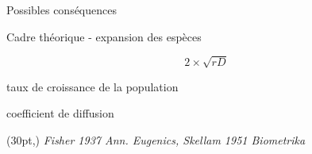 \documentclass[11pt, compress, aspectratio=1610]{beamer}
\newcommand\smallcitation[1]{%
\begin{textblock*}{\textwidth}(30pt,\textheight)
	\raggedleft \footnotesize\textit{#1}
\end{textblock*}}
\providecommand{\tightlist}{%
  \setlength{\itemsep}{0pt}\setlength{\parskip}{0pt}}
\begin{document}
\begin{frame}{Possibles conséquences}
\protect\hypertarget{possibles-consuxe9quences}{}

\vspace*{-15mm}
\begin{center}
\end{center}

\end{frame}

\begin{frame}{Cadre théorique - expansion des espèces}
\protect\hypertarget{cadre-thuxe9orique---expansion-des-espuxe8ces}{}

\begin{LARGE}
$$ 2 \times \sqrt{rD} $$
\end{LARGE}

\begin{description}
\tightlist
\item[r]
taux de croissance de la population
\item[D]
coefficient de diffusion
\end{description}

\smallcitation{Fisher 1937 Ann. Eugenics, Skellam 1951 Biometrika}

\end{frame}
\end{document}
